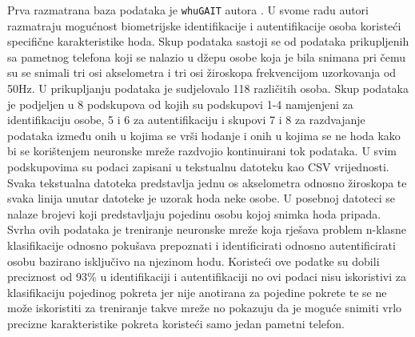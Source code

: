 \documentclass[times, utf8, diplomski]{fer}
\begin{document}
Prva razmatrana baza podataka je \texttt{whuGAIT} autora \cite{zou2020gait}. U svome radu autori razmatraju mogućnost biometrijske
identifikacije i autentifikacije osoba koristeći specifične karakteristike hoda. Skup podataka sastoji se od podataka prikupljenih
sa pametnog telefona koji se nalazio u džepu osobe koja je bila snimana pri čemu su se snimali tri osi akselometra i tri osi
žiroskopa frekvencijom uzorkovanja od 50Hz. U prikupljanju podataka je sudjelovalo 118 različitih osoba. Skup podataka je podjeljen
u 8 podskupova od kojih su podskupovi 1-4 namjenjeni za identifikaciju osobe, 5 i 6 za autentifikaciju i skupovi 7 i 8 za
razdvajanje podataka između onih u kojima se vrši hodanje i onih u kojima se ne hoda kako bi se korištenjem neuronske mreže
razdvojio kontinuirani tok podataka. U svim podskupovima su podaci zapisani u tekstualnu datoteku kao CSV vrijednosti. Svaka
tekstualna datoteka predstavlja jednu os akselometra odnosno žiroskopa te svaka linija unutar datoteke je uzorak hoda neke osobe.
U posebnoj datoteci se nalaze brojevi koji predstavljaju pojedinu osobu kojoj snimka hoda pripada. Svrha ovih podataka je treniranje
neuronske mreže koja rješava problem n-klasne klasifikacije odnosno pokušava prepoznati i identificirati odnosno autentificirati
osobu bazirano isključivo na njezinom hodu. Koristeći ove podatke \cite{zou2020gait} su dobili preciznost od 93\% u identifikaciji 
i autentifikaciji no ovi podaci nisu iskoristivi za klasifikaciju pojedinog pokreta jer nije anotirana za pojedine pokrete te se 
ne može iskoristiti za treniranje takve mreže no pokazuju da je moguće snimiti vrlo precizne karakteristike pokreta koristeći samo 
jedan pametni telefon.
\end{document}
